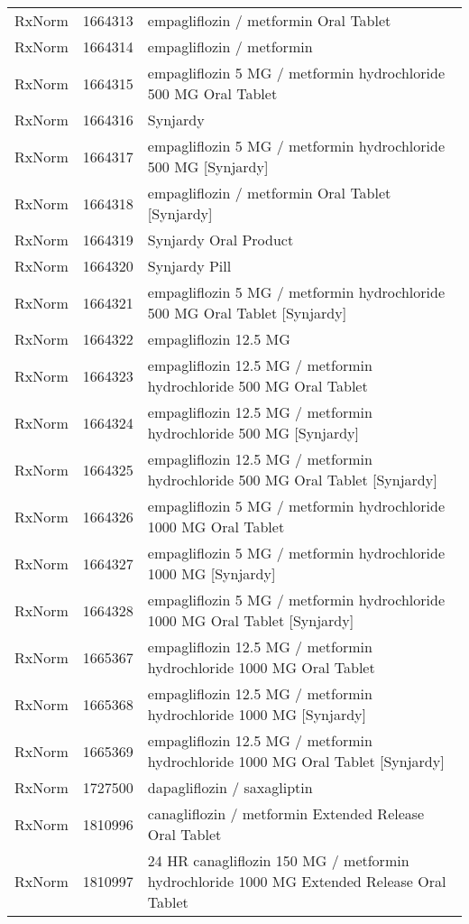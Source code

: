\begin{longtable}{p{}p{}p{}}
  RxNorm & 1664313 & empagliflozin / metformin Oral Tablet \\ 
  RxNorm & 1664314 & empagliflozin / metformin \\ 
  RxNorm & 1664315 & empagliflozin 5 MG / metformin hydrochloride 500 MG Oral Tablet \\ 
  RxNorm & 1664316 & Synjardy \\ 
  RxNorm & 1664317 & empagliflozin 5 MG / metformin hydrochloride 500 MG [Synjardy] \\ 
  RxNorm & 1664318 & empagliflozin / metformin Oral Tablet [Synjardy] \\ 
  RxNorm & 1664319 & Synjardy Oral Product \\ 
  RxNorm & 1664320 & Synjardy Pill \\ 
  RxNorm & 1664321 & empagliflozin 5 MG / metformin hydrochloride 500 MG Oral Tablet [Synjardy] \\ 
  RxNorm & 1664322 & empagliflozin 12.5 MG \\ 
  RxNorm & 1664323 & empagliflozin 12.5 MG / metformin hydrochloride 500 MG Oral Tablet \\ 
  RxNorm & 1664324 & empagliflozin 12.5 MG / metformin hydrochloride 500 MG [Synjardy] \\ 
  RxNorm & 1664325 & empagliflozin 12.5 MG / metformin hydrochloride 500 MG Oral Tablet [Synjardy] \\ 
  RxNorm & 1664326 & empagliflozin 5 MG / metformin hydrochloride 1000 MG Oral Tablet \\ 
  RxNorm & 1664327 & empagliflozin 5 MG / metformin hydrochloride 1000 MG [Synjardy] \\ 
  RxNorm & 1664328 & empagliflozin 5 MG / metformin hydrochloride 1000 MG Oral Tablet [Synjardy] \\ 
  RxNorm & 1665367 & empagliflozin 12.5 MG / metformin hydrochloride 1000 MG Oral Tablet \\ 
  RxNorm & 1665368 & empagliflozin 12.5 MG / metformin hydrochloride 1000 MG [Synjardy] \\ 
  RxNorm & 1665369 & empagliflozin 12.5 MG / metformin hydrochloride 1000 MG Oral Tablet [Synjardy] \\ 
  RxNorm & 1727500 & dapagliflozin / saxagliptin \\ 
  RxNorm & 1810996 & canagliflozin / metformin Extended Release Oral Tablet \\ 
  RxNorm & 1810997 & 24 HR canagliflozin 150 MG / metformin hydrochloride 1000 MG Extended Release Oral Tablet \\ 

\end{longtable}

